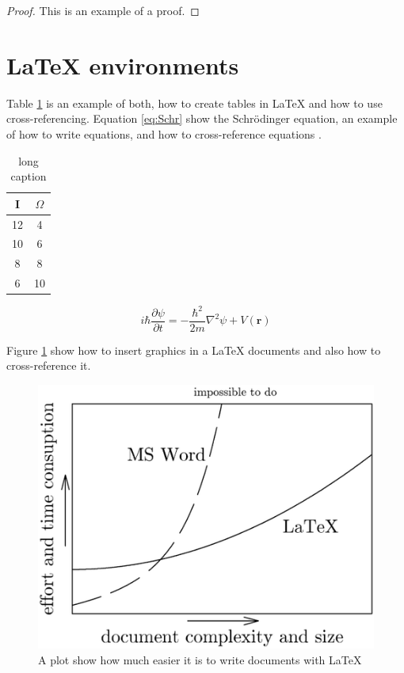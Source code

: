\begin{proof}
This is an example of a proof.
\end{proof}

\section{\LaTeX{} environments}

Table \ref{tab:ResitanceTable} is an example of both, how to create tables in \LaTeX{} and how to use cross-referencing. Equation \ref{eq:Schr} show the Schr\"{o}dinger equation, an example of how to write equations, and how to cross-reference equations \cite{Quantum}.

\begin{table}[h!]
	\centering
	\begin{tabular}{c | c}
		I & $\Omega$ \\ \hline
		12 & 4 \\
		10 & 6 \\
		8 & 8 \\
		6 & 10 \\
	\end{tabular}
	\caption[short caption]{long caption}%
	\label{tab:ResitanceTable}
\end{table}

\begin{equation}
i\hbar \frac{\partial \psi}{\partial t} = -\frac{\hbar^2}{2m}\nabla^2 \psi + V(\mathbf{r})
\label{eq:Schr}
\end{equation}

Figure \ref{fig:WordVsLatex} show how to insert graphics in a \LaTeX{} documents and also how to cross-reference it.

\begin{figure}[h!]
\centering
\includegraphics[width=0.6 \textwidth]{pics/WordVsLatex.png}
\caption{A plot show how much easier it is to write documents with \LaTeX{}} \label{fig:WordVsLatex}
\end{figure}

